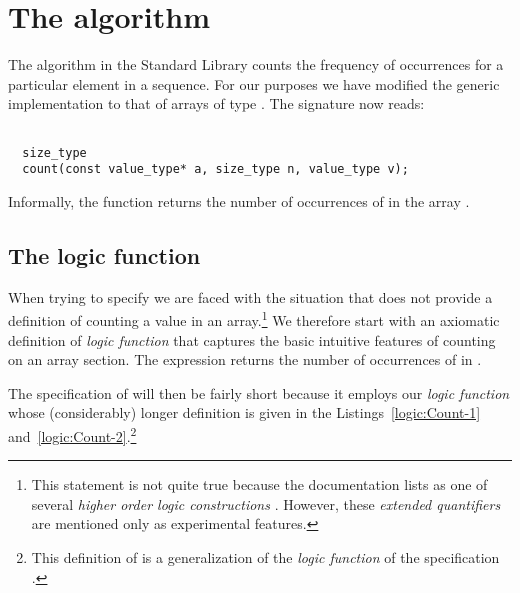 
\section{The \counti algorithm}

The \counti algorithm in the \cxx Standard Library \cite[\S
28.5.9]{cxx-17-draft} counts
the frequency of occurrences for a particular element in
a sequence.
For our purposes we have modified
the generic implementation
to that of arrays of type .
The signature now reads:

\begin{lstlisting}[style = acsl-block]

  size_type
  count(const value_type* a, size_type n, value_type v);
\end{lstlisting}

Informally, the function returns the number of occurrences of
 in the array .

\subsection{The logic function \Count}

When trying to specify \counti we are faced with the situation that
\acsl does not provide a definition of counting a value in an array.\footnote{
  This statement is not quite true because the \acsl documentation 
  lists  as one of several \emph{higher order logic constructions} \cite[\S 2.6.7]{ACSLSpec}.
  However, these \emph{extended quantifiers} are mentioned only as experimental features.
}
We therefore start with an axiomatic definition of \emph{logic function} \Count
that captures the basic intuitive features of counting on an array section.
The expression  returns the number of
occurrences of  in .

The specification of \counti will then be fairly short because it employs
our \emph{logic function}
\Count whose (considerably) longer definition is given in the 
Listings~\ref{logic:Count-1} and~\ref{logic:Count-2}.\footnote{
 This definition of \Count is a generalization of
 the \emph{logic function}  of the \acsl specification \cite{ACSLSpec}.
}


